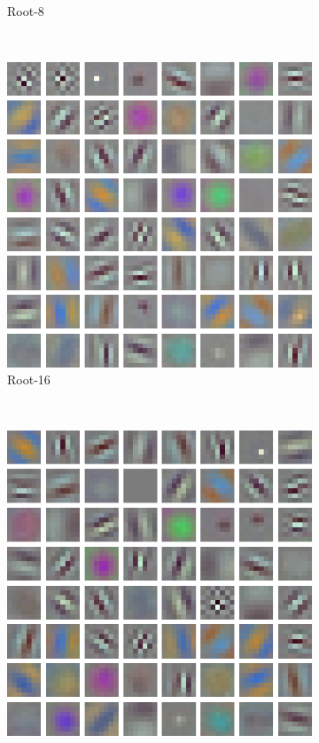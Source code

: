 \documentclass[thesis]{subfiles}
\begin{document}
\begin{figure}[tb]
\begin{subfigure}[b]{0.45\textwidth}
			\caption{Root-8}
			\label{fig:resnet50root8conv0}
		\end{subfigure}
		~
		\begin{subfigure}[b]{0.45\textwidth}
			\centering
			\includegraphics[width=\textwidth]{Figs/Raster/msrc-resnet-50-conv1-root32-convonly}
			\caption{Root-16}
			\label{fig:resnet50root16conv0}
		\end{subfigure}
		~
		\begin{subfigure}[b]{0.45\textwidth}
			\centering
			\includegraphics[width=\textwidth]{Figs/Raster/msrc-resnet-50-conv1-root64-convonly}

\end{subfigure}
\end{figure}
\end{document}
